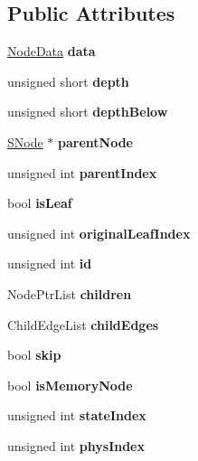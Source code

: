 \subsection*{Public Attributes}
\begin{DoxyCompactItemize}
\item 
\mbox{\label{classSNode_a584a7b8ea5a127d18a6278653a40e919}} 
\mbox{\hyperlink{structNodeData}{Node\+Data}} {\bfseries data}
\item 
\mbox{\label{classSNode_a503a43a213bb338e8b95494efa78b16b}} 
unsigned short {\bfseries depth}
\item 
\mbox{\label{classSNode_acba8392c4eb5ce49d44a9ff6dd0d5b0f}} 
unsigned short {\bfseries depth\+Below}
\item 
\mbox{\label{classSNode_a27057ef2ba208316af5f21e8bc98a671}} 
\mbox{\hyperlink{classSNode}{S\+Node}} $\ast$ {\bfseries parent\+Node}
\item 
\mbox{\label{classSNode_ab0c7bcc4aff86b4fa1b5a61cd376f0e8}} 
unsigned int {\bfseries parent\+Index}
\item 
\mbox{\label{classSNode_a67af44654f30a726566e22bf8a7ef61c}} 
bool {\bfseries is\+Leaf}
\item 
\mbox{\label{classSNode_af4677b8f9a2d53a185917dc58df285a1}} 
unsigned int {\bfseries original\+Leaf\+Index}
\item 
\mbox{\label{classSNode_a3cb43c011865b994a773aa62316afb1e}} 
unsigned int {\bfseries id}
\item 
\mbox{\label{classSNode_a0cdfd1e634873ec4736a7e3410b22860}} 
Node\+Ptr\+List {\bfseries children}
\item 
\mbox{\label{classSNode_a6e95afd1b8741d59b6ace682c37d4169}} 
Child\+Edge\+List {\bfseries child\+Edges}
\item 
\mbox{\label{classSNode_a27dbcadda9670304579a8e80a2aa7e12}} 
bool {\bfseries skip}
\item 
\mbox{\label{classSNode_a71ae0f498e461be20be553b483334a34}} 
bool {\bfseries is\+Memory\+Node}
\item 
\mbox{\label{classSNode_a8f933a4c277592ed9a387c5cfe36de41}} 
unsigned int {\bfseries state\+Index}
\item 
\mbox{\label{classSNode_a47b3e16c46eb32180cf9effcbd08abed}} 
unsigned int {\bfseries phys\+Index}
\end{DoxyCompactItemize}



